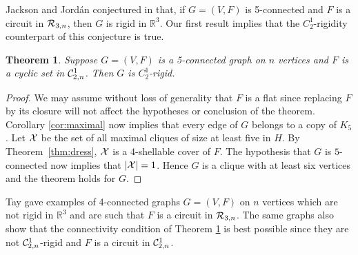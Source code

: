 \documentclass{daj}
\newtheorem{theorem}[thm]{Theorem}\theoremstyle{plain}
\newcommand{\R}{\mathbb{R}}
\begin{document}
Jackson and Jord\'an 
conjectured in \cite[Example 2]{JJ06} that, if $G=(V,F)$ is 5-connected and $F$ is a circuit in ${\cal R}_{3,n}$, then $G$ is rigid in $\R^3$. Our first result implies that the $C_2^1$-rigidity counterpart of this conjecture is true.  
%


\begin{theorem}
\label{thm:5conn_conn}
Suppose $G=(V,F)$ is a 5-connected graph on $n$ vertices and 
$F$ is a cyclic set in ${\cal C}_{2,n}^1$.   Then $G$ is $C_{2}^1$-rigid. %
\end{theorem}
\begin{proof} We may assume without loss of generality that $F$ is a flat since replacing $F$ by its closure will not affect the hypotheses or conclusion of the theorem. Corollary \ref{cor:maximal} now implies that every edge of $G$ belongs to a copy of $K_5$.
Let ${\cal X}$ be the set of all maximal cliques of size at least five in $H$. By Theorem~\ref{thm:dress},  ${\cal X}$ is a 4-shellable  cover of $F$. The hypothesis that $G$ is $5$-connected now implies that
$|{\cal X}|=1$. Hence $G$ is a clique with at least six vertices and the theorem holds for $G$. 
\end{proof} 

Tay \cite{T93} gave examples of 4-connected graphs $G=(V,F)$ on $n$ vertices which are not rigid in $\R^3$ and are such that $F$ is a circuit 
in ${\cal R}_{3,n}$. The same  graphs also show that the connectivity condition of Theorem \ref{thm:5conn_conn} is best possible since they are not ${\cal C}_{2,n}^1$-rigid and $F$ is a circuit  in ${\cal C}_{2,n}^1$.
\end{document}
